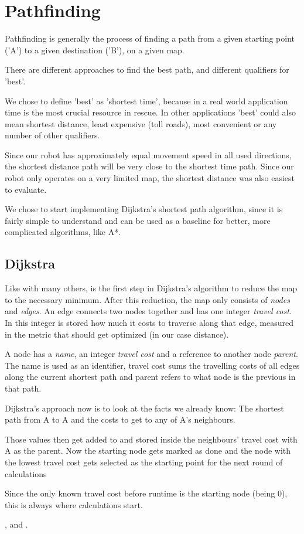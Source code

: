 \chapter{Pathfinding}\label{ch:path}
Pathfinding is generally the process of finding a path from a given starting point ('A')
to a given destination ('B'),
on a given map.

There are different approaches to find the best path,
and different qualifiers for 'best'.

We chose to define 'best' as 'shortest time',
because in a real world application time is the most crucial resource in rescue.
In other applications 'best' could also mean shortest distance, least expensive (toll roads),
most convenient or any number of other qualifiers.

Since our robot has approximately equal movement speed in all used directions,
the shortest distance path will be very close to the shortest time path.
Since our robot only operates on a very limited map,
the shortest distance was also easiest to evaluate.

We chose to start implementing Dijkstra's shortest path algorithm,
since it is fairly simple to understand
and can be used as a baseline for better, more complicated algorithms,
like A*.

\section{Dijkstra}
Like with many others,
is the first step in Dijkstra's algorithm to reduce the map to the necessary minimum.
After this reduction, the map only consists of \emph{nodes} and \emph{edges}.
An edge connects two nodes together and has one integer \emph{travel cost}.
In this integer is stored how much it costs to traverse along that edge,
measured in the metric that should get optimized (in our case distance).

A node has a \emph{name}, an integer \emph{travel cost} and a reference to another node \emph{parent}.
The name is used as an identifier,
travel cost sums the travelling costs of all edges along the current shortest path
and parent refers to what node is the previous in that path.



Dijkstra's approach now is to look at the facts we already know:
The shortest path from A to A
and the costs to get to any of A's neighbours.

Those values then get added to and stored  inside the neighbours' travel cost with A as the parent.
Now the starting node gets marked as done
and the node with the lowest travel cost gets selected
as the starting point for the next round of calculations


Since the only known travel cost before runtime is the starting node (being 0),
this is always where calculations start.



\cite{Madsen2010}, \cite{Oetiker2010} and \cite{Mittelbach2005}.
